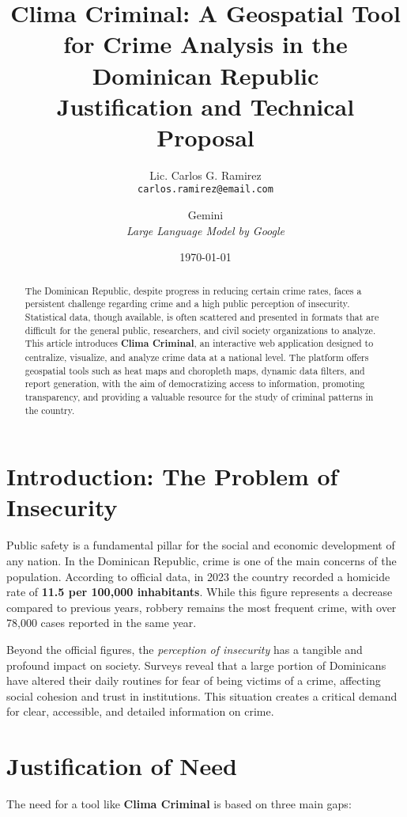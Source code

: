 \documentclass[12pt, a4paper]{article}
\title{
    {\huge Clima Criminal: A Geospatial Tool for Crime Analysis in the Dominican Republic} \\
    \vspace{0.5cm}
    \large Justification and Technical Proposal
}
\author{
    Lic. Carlos G. Ramirez \\
    \texttt{carlos.ramirez@email.com} %
    \and
    Gemini \\
    \textit{Large Language Model by Google}
}
\date{\today}
\begin{document}
\maketitle

\begin{abstract}
The Dominican Republic, despite progress in reducing certain crime rates, faces a persistent challenge regarding crime and a high public perception of insecurity. Statistical data, though available, is often scattered and presented in formats that are difficult for the general public, researchers, and civil society organizations to analyze. This article introduces \textbf{Clima Criminal}, an interactive web application designed to centralize, visualize, and analyze crime data at a national level. The platform offers geospatial tools such as heat maps and choropleth maps, dynamic data filters, and report generation, with the aim of democratizing access to information, promoting transparency, and providing a valuable resource for the study of criminal patterns in the country.
\end{abstract}

\section{Introduction: The Problem of Insecurity}

Public safety is a fundamental pillar for the social and economic development of any nation. In the Dominican Republic, crime is one of the main concerns of the population. According to official data, in 2023 the country recorded a homicide rate of \textbf{11.5 per 100,000 inhabitants}. While this figure represents a decrease compared to previous years, robbery remains the most frequent crime, with over 78,000 cases reported in the same year.

Beyond the official figures, the \textit{perception of insecurity} has a tangible and profound impact on society. Surveys reveal that a large portion of Dominicans have altered their daily routines for fear of being victims of a crime, affecting social cohesion and trust in institutions. This situation creates a critical demand for clear, accessible, and detailed information on crime.

\section{Justification of Need}

The need for a tool like \textbf{Clima Criminal} is based on three main gaps:
\end{document}
